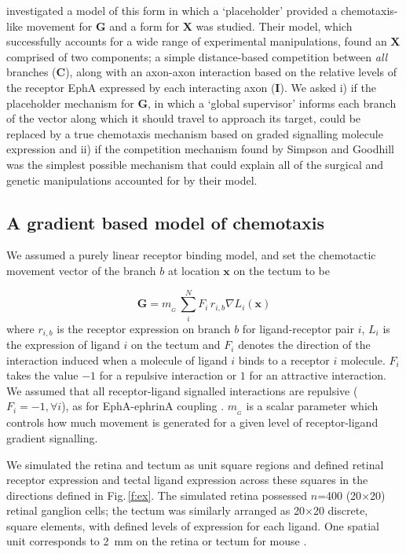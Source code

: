 \documentclass[11pt, a4paper]{article}
\begin{document}
\citet{simpson_simple_2011} investigated a model of this form in which a `placeholder' provided a chemotaxis-like movement for $\mathbf{G}$ and a form for $\mathbf{X}$ was studied.
Their model, which successfully accounts for a wide range of experimental manipulations, found an $\mathbf{X}$ comprised of two components; a simple distance-based competition between \emph{all} branches ($\mathbf{C}$), along with an axon-axon interaction based on the relative levels of the receptor EphA expressed by each interacting axon ($\mathbf{I}$).  
We asked i) if the placeholder mechanism for $\mathbf{G}$, in which a `global supervisor' informs each branch of the vector along which it should travel to approach its target, could be replaced by a true chemotaxis mechanism based on graded signalling molecule expression and ii) if the competition mechanism found by Simpson and Goodhill was the simplest possible mechanism that could explain all of the surgical and genetic manipulations accounted for by their model.

\subsection*{A gradient based model of chemotaxis}

We assumed a purely linear receptor binding model, and set the chemotactic movement vector of the branch $b$ at location $\mathbf{x}$ on the tectum to be

\begin{equation}\label{e:G}
\mathbf{G} = m_{\!_G}\,\sum_i^N F_i\,r_{i,b} \nabla L_i(\mathbf{x})
\end{equation}
%
where $r_{i,b}$ is the receptor expression on branch $b$ for ligand-receptor pair $i$, $L_i$ is the expression of ligand $i$ on the tectum and $F_i$ denotes the direction of the interaction induced when a molecule of ligand $i$ binds to a receptor $i$ molecule. 
$F_i$ takes the value $-1$ for a repulsive interaction or $1$ for an attractive interaction.
%
We assumed that all receptor-ligand signalled interactions are repulsive ($F_i=-1, \forall i$), as for EphA-ephrinA coupling \citep{drescher_vitro_1995,nakamoto_topographically_1996}.
%
$m_{\!_G}$ is a scalar parameter which controls how much movement is generated for a given level of receptor-ligand gradient signalling.

We simulated the retina and tectum as unit square regions and defined retinal receptor expression and tectal ligand expression across these squares in the directions defined in Fig.\,\ref{f:ex}. 
The simulated retina possessed $n$=400 (20$\times$20) retinal ganglion cells; the tectum was similarly arranged as 20$\times$20 discrete, square elements, with defined levels of expression for each ligand. 
One spatial unit corresponds to 2~mm on the retina or tectum for mouse \citep{reber_relative_2004}.
\end{document}
